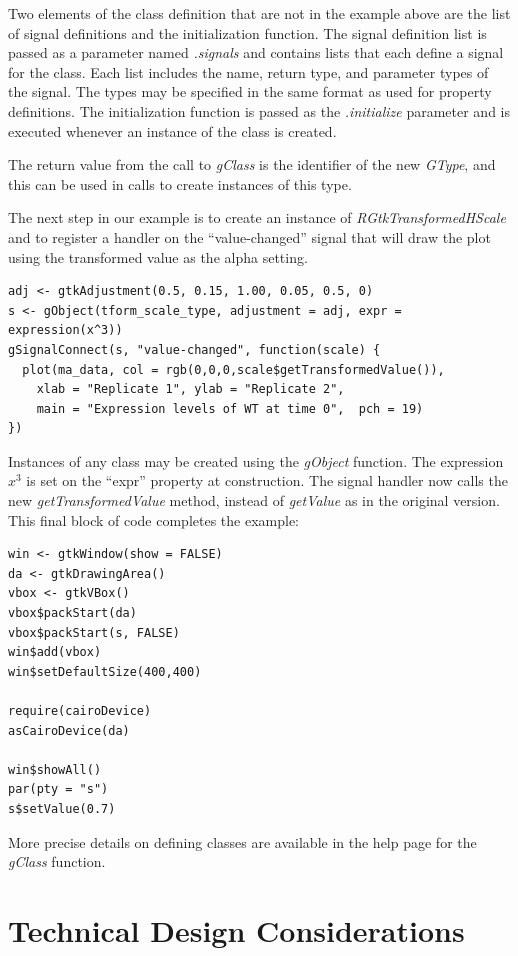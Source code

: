 \documentclass[article]{jss}
\begin{document}
Two elements of the class definition that are not in the example above
are
the list of signal definitions and the initialization function.
The signal definition list is passed as a parameter named \emph{.signals} and contains lists that each
define a signal for the class. Each list includes the name, return
type, and parameter types of the signal. The types may be specified in the same format as used for property definitions. The initialization
function is passed as the \emph{.initialize} parameter and is executed whenever an instance of the class is created.

The return value from the call to \emph{gClass} is the identifier of the new \emph{GType}, and this can be used in calls to create instances of this type.

The next step in our example is to create an instance
of \emph{RGtkTransformedHScale} and to register a handler on the 
``value-changed'' signal that will draw the plot using the transformed
value as 
the alpha setting.
\begin{verbatim}
adj <- gtkAdjustment(0.5, 0.15, 1.00, 0.05, 0.5, 0)
s <- gObject(tform_scale_type, adjustment = adj, expr =
expression(x^3))
gSignalConnect(s, "value-changed", function(scale) {
  plot(ma_data, col = rgb(0,0,0,scale$getTransformedValue()),
    xlab = "Replicate 1", ylab = "Replicate 2", 
    main = "Expression levels of WT at time 0",  pch = 19)
})
\end{verbatim}
Instances of any  class may be created using the
\emph{gObject} function.
The expression $x^3$ is set on the ``expr'' property at construction.
The
signal handler now calls the new \emph{getTransformedValue} method,
instead
of \emph{getValue} as in the original version. This final block of
code
completes the example:
\begin{verbatim}
win <- gtkWindow(show = FALSE)
da <- gtkDrawingArea()
vbox <- gtkVBox()
vbox$packStart(da)
vbox$packStart(s, FALSE)
win$add(vbox)
win$setDefaultSize(400,400)

require(cairoDevice)
asCairoDevice(da)

win$showAll()
par(pty = "s")
s$setValue(0.7)
\end{verbatim}

More precise details on defining  classes are available
in the 
 help page for the \emph{gClass} function.

\section{Technical Design Considerations}
\end{document}
